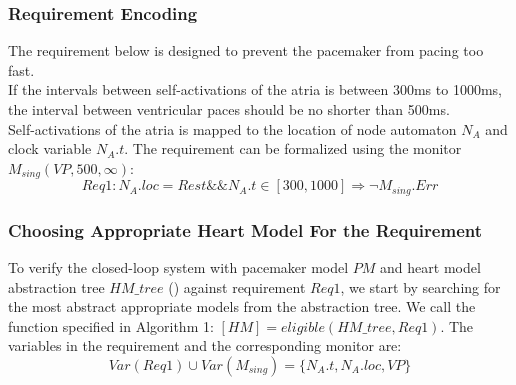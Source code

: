 \subsubsection{Requirement Encoding}
The requirement below is designed to prevent the pacemaker from pacing too fast.\\
\textsf{If the intervals between self-activations of the atria is between 300ms to 1000ms, the interval between ventricular paces should be no shorter than 500ms.}\\
Self-activations of the atria is mapped to the location of node automaton $N_A$ and clock variable $N_A.t$.
The requirement can be formalized using the monitor  $M_{sing}(VP,500,\infty)$:
\[Req1: N_A.loc=Rest \&\& N_A.t\in [300,1000] \Rightarrow \neg M_{sing}.Err\]
%
 \subsubsection{Choosing Appropriate Heart Model For the Requirement}
To verify the closed-loop system with pacemaker model $PM$ and heart model abstraction tree $HM\_tree$ () against requirement $Req1$, we start by searching for the most abstract appropriate models from the abstraction tree. We call the function specified in Algorithm 1: $[HM]=eligible(HM\_tree,Req1)$. The variables in the requirement and the corresponding monitor are:
$$Var(Req1)\cup Var(M_{sing})=\{N_A.t,N_A.loc, VP\}$$

